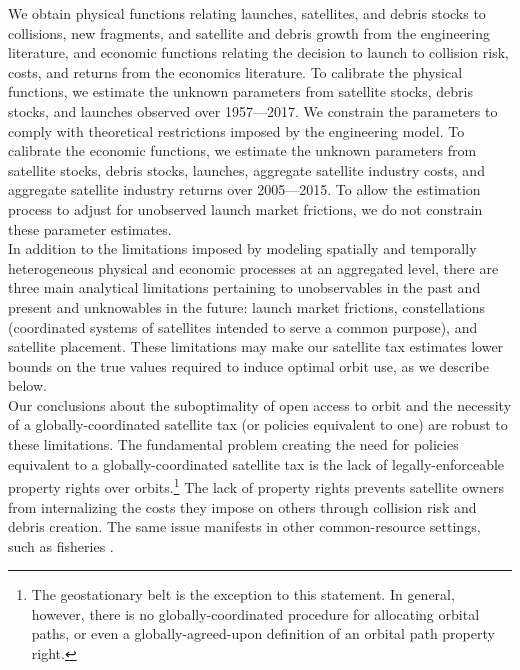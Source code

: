 \documentclass[12pt]{article}
\begin{document}
We obtain physical functions relating launches, satellites, and debris stocks to collisions, new fragments, and satellite and debris growth from the engineering literature, and economic functions relating the decision to launch to collision risk, costs, and returns from the economics literature. To calibrate the physical functions, we estimate the unknown parameters from satellite stocks, debris stocks, and launches observed over 1957---2017. We constrain the parameters to comply with theoretical restrictions imposed by the engineering model. To calibrate the economic functions, we estimate the unknown parameters from satellite stocks, debris stocks, launches, aggregate satellite industry costs, and aggregate satellite industry returns over 2005---2015. To allow the estimation process to adjust for unobserved launch market frictions, we do not constrain these parameter estimates. \\

In addition to the limitations imposed by modeling spatially and temporally heterogeneous physical and economic processes at an aggregated level, there are three main analytical limitations pertaining to unobservables in the past and present and unknowables in the future: launch market frictions, constellations (coordinated systems of satellites intended to serve a common purpose), and satellite placement. These limitations may make our satellite tax estimates lower bounds on the true values required to induce optimal orbit use, as we describe below.\\ 

Our conclusions about the suboptimality of open access to orbit and the necessity of a globally-coordinated satellite tax (or policies equivalent to one) are robust to these limitations.  The fundamental problem creating the need for policies equivalent to a globally-coordinated satellite tax is the lack of legally-enforceable property rights over orbits.\footnote{The geostationary belt is the exception to this statement. In general, however, there is no globally-coordinated procedure for allocating orbital paths, or even a globally-agreed-upon definition of an orbital path property right.} The lack of property rights prevents satellite owners from internalizing the costs they impose on others through collision risk and debris creation. The same issue manifests in other common-resource settings, such as fisheries \cite{gordon1954}. \\
\end{document}
